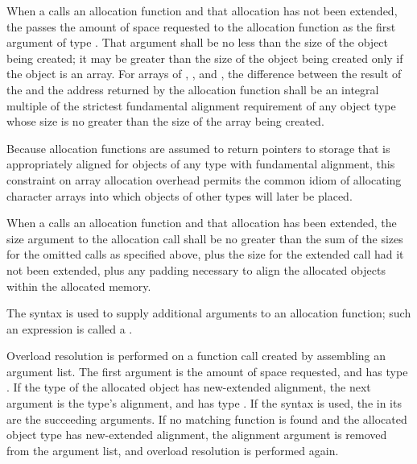 \pnum
When a  calls an allocation function and that
allocation has not been extended, the
 passes the amount of space requested to the
allocation function as the first argument of type
. That argument shall be no less than the size
of the object being created; it may be greater than the size of the
object being created only if the object is an array. For arrays of
, , and ,
the difference between the
result of the  and the address returned by the
allocation function shall be an integral multiple of the
strictest fundamental
alignment requirement of any object type whose size
is no greater than the size of the array being created.
\begin{note}
%
Because allocation functions are assumed to return pointers to storage
that is appropriately aligned for objects of any type
with fundamental alignment, this constraint
on array allocation overhead permits the common idiom of allocating
character arrays into which objects of other types will later be placed.
\end{note}

\pnum
When a  calls an allocation function and that
allocation has been extended, the size argument to the allocation call shall
be no greater than the sum of the sizes for the omitted calls as specified
above, plus the size for the extended call had it not been extended, plus any
padding necessary to align the allocated objects within the allocated memory.

\pnum
{}%
The  syntax is used to supply additional
arguments to an allocation function; such an expression is called
a .

\pnum
Overload resolution is
performed on a function call created by assembling an argument list.
The first argument is
the amount of space requested,
and has type .
If the type of the allocated object has new-extended alignment,
the next argument is
the type's alignment,
and has type .
If the  syntax is used,
the 
in its 
are the succeeding arguments.
If no matching function is found
and the allocated object type has new-extended alignment,
the alignment argument is removed from the argument list,
and overload resolution is performed again.

